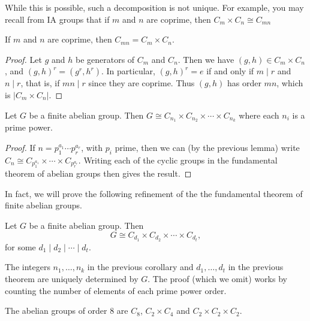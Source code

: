 \documentclass[a4paper]{scrartcl}
\begin{document}
\begin{remark}
	While this is possible, such a decomposition is not unique.
For example, you may recall from IA groups that if $m$ and $n$ are coprime, then $C_m \times C_n \cong C_{mn}$
\end{remark}

\begin{lemma}
	If $m$ and $n$ are coprime, then $C_{mn} = C_m \times C_n$.
\end{lemma}
\begin{proof}
	Let $g$ and $h$ be generators of $C_m$ and $C_n$. Then we have $(g, h) \in C_m \times C_n$, and $(g, h)^r = (g^r, h^r)$. In particular, $(g, h)^r = e$ if and only if $m \mid r$ and $n \mid r$, that is, if $mn \mid r$ since they are coprime. Thus $(g, h)$ has order $mn$, which is $|C_m \times C_n|$.
\end{proof}

\begin{corollary}
	Let $G$ be a finite abelian group.
	Then $G \cong C_{n_1} \times C_{n_2} \times \cdots \times C_{n_k}$ where each $n_i$ is a prime power.
\end{corollary}
\begin{proof}
	If $n = p_1^{a_1} \cdots p_r^{a_r}$, with $p_i$ prime, then we can (by the previous lemma) write $C_{n} \cong C_{p_1^{a_1}} \times \cdots \times C_{p_r^{a_r}}$. Writing each of the cyclic groups in the fundamental theorem of abelian groups then gives the result.
\end{proof}


In fact, we will prove the following refinement of the the fundamental theorem of finite abelian groups.

\begin{theorem}
	Let $G$ be a finite abelian group. Then
	$$
	G \cong C_{d_1} \times C_{d_2} \times \cdots \times C_{d_t},
	$$
	for some $d_1 \mid d_2 \mid \cdots \mid d_t$.
\end{theorem}

\begin{remark}
	The integers $n_1, \dots, n_k$ in the previous corollary and $d_1, \dots, d_t$ in the previous theorem are uniquely determined by $G$.
	The proof (which we omit) works by counting the number of elements of each prime power order.
\end{remark}

\begin{example}
	The abelian groups of order 8 are $C_8$, $C_2 \times C_4$ and $C_2 \times C_2 \times C_2$.
\end{example}
\end{document}

